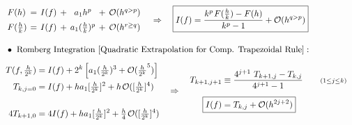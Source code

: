 \documentclass[12pt]{article}
\newcommand{\hs}{\hspace{1pt}}
\begin{document}
\vspace{5pt}
\(\hspace{10pt}
    \begin{aligned}
        &\arraycolsep=2pt \begin{array}{l c c c c c c}
                F(h) &= 
                    &I(f) 
                    &+ 
                    &a_1 h^p 
                    &+ 
                    &\mathcal{O}(h^{q > p})
                    \\[5pt]
                F(\tfrac{h}{k}) &=   
                    &I(f) 
                    &+ 
                    &a_1 ( \tfrac{h}{k} )^p 
                    &+ 
                    &\mathcal{O}(h^{r \geq q})
            \end{array}
            \hspace{10pt} \Rightarrow \hspace{10pt}
            \boxed{ I(f) = \frac{ k^{p} \hs F( \tfrac{h}{k} ) - F(h) }{ k^{p} - 1 } + \mathcal{O}(h^{q>p}) }
            \\[10pt]
        &\bullet\ \text{Romberg Integration [Quadratic Extrapolation for Comp. Trapezoidal Rule]}:
            \\[5pt]
        &\begin{aligned}
                T(f, \tfrac{h}{2^k} ) &= I(f) 
                    + 2^k \left[ a_1 ( \tfrac{h}{2^k} )^3 
                    + \mathcal{O}(\tfrac{h}{2^k}^{5}) \right]
                    \\
                T_{k,j=0} &= I(f) 
                    + h a_1 [\tfrac{h}{2^k}]^2 
                    + h\hs \mathcal{O}([\tfrac{h}{2^k}]^4)
                    \\[15pt]
                4T_{k+1,0} &= 4I(f) 
                    + h a_1 [\tfrac{h}{2^k}]^2 
                    + \tfrac{h}{4}\hs \mathcal{O}( [\tfrac{h}{2^{k}}]^4)
            \end{aligned}
            \hspace{10pt} \Rightarrow \hspace{10pt}
            \begin{aligned}
                T_{k+1, j+1} &\equiv \frac{ 4^{j+1}\ T_{k+1, j} - T_{k, j} }{ 4^{j+1} - 1 }
                    \hspace{20pt} {\scriptstyle (1 \leq j \leq k)}
                    \\[5pt]
                \Aboxed{ I(f) &= T_{k, j} + \mathcal{O}(h^{2j+2}) }
            \end{aligned}
    \end{aligned}
\)
\end{document}

